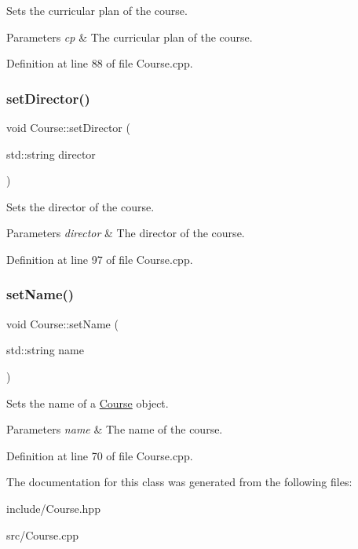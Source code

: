 Sets the curricular plan of the course. 
\begin{DoxyParams}{Parameters}
{\em cp} & The curricular plan of the course. \\
\hline
\end{DoxyParams}


Definition at line 88 of file Course.\+cpp.

\mbox{\label{classCourse_a3b5489259ca31e4ffa2802dd84073b32}} 
\subsubsection{\texorpdfstring{set\+Director()}{setDirector()}}
{\footnotesize\ttfamily void Course\+::set\+Director (\begin{DoxyParamCaption}\item[{std\+::string}]{director }\end{DoxyParamCaption})}

Sets the director of the course. 
\begin{DoxyParams}{Parameters}
{\em director} & The director of the course. \\
\hline
\end{DoxyParams}


Definition at line 97 of file Course.\+cpp.

\mbox{\label{classCourse_a9bf594cc571e3cadd5d8df30c919bfa7}} 
\subsubsection{\texorpdfstring{set\+Name()}{setName()}}
{\footnotesize\ttfamily void Course\+::set\+Name (\begin{DoxyParamCaption}\item[{std\+::string}]{name }\end{DoxyParamCaption})}

Sets the name of a \hyperlink{classCourse}{Course} object. 
\begin{DoxyParams}{Parameters}
{\em name} & The name of the course. \\
\hline
\end{DoxyParams}


Definition at line 70 of file Course.\+cpp.



The documentation for this class was generated from the following files\+:\begin{DoxyCompactItemize}
\item 
include/Course.\+hpp\item 
src/Course.\+cpp\end{DoxyCompactItemize}
